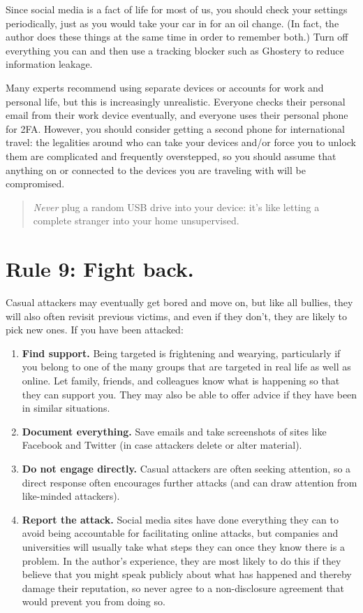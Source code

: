 \documentclass[10pt,letterpaper]{article}
\newcommand{\rulemajor}[1]{\section*{#1}}
\begin{document}
Since social media is a fact of life for most of us,
you should check your settings periodically,
just as you would take your car in for an oil change.
(In fact,
the author does these things at the same time in order to remember both.)
Turn off everything you can
and then use a tracking blocker such as Ghostery to reduce information leakage.

Many experts recommend using separate devices or accounts for work and personal life,
but this is increasingly unrealistic.
Everyone checks their personal email from their work device eventually,
and everyone uses their personal phone for 2FA.
However,
you should consider getting a second phone for international travel:
the legalities around who can take your devices
and/or force you to unlock them are complicated and frequently overstepped,
so you should assume that anything on or connected to the devices you are traveling with
will be compromised.

\begin{quote}
  \emph{Never} plug a random USB drive into your device:
  it's like letting a complete stranger into your home unsupervised.
\end{quote}

\rulemajor{Rule 9: Fight back.}

Casual attackers may eventually get bored and move on,
but like all bullies,
they will also often revisit previous victims,
and even if they don't,
they are likely to pick new ones.
If you have been attacked:

\begin{enumerate}

\item
  \textbf{Find support.}
  Being targeted is frightening and wearying,
  particularly if you belong to one of the many groups that are targeted in real life
  as well as online.
  Let family, friends, and colleagues know what is happening so that they can support you.
  They may also be able to offer advice if they have been in similar situations.
  
\item
  \textbf{Document everything.}
  Save emails
  and take screenshots of sites like Facebook and Twitter
  (in case attackers delete or alter material).

\item
  \textbf{Do not engage directly.}
  Casual attackers are often seeking attention,
  so a direct response often encourages further attacks
  (and can draw attention from like-minded attackers).
  
\item
  \textbf{Report the attack.}
  Social media sites have done everything they can
  to avoid being accountable for facilitating online attacks,
  but companies and universities will usually take what steps they can
  once they know there is a problem.
  In the author's experience,
  they are most likely to do this if they believe that
  you might speak publicly about what has happened
  and thereby damage their reputation,
  so never agree to a non-disclosure agreement that would prevent you from doing so.
  
\end{enumerate}
\end{document}
